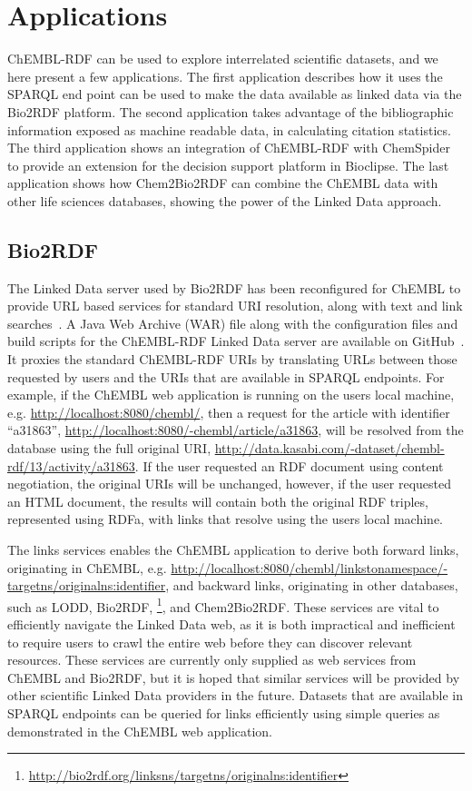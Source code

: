 \documentclass[sw]{iosart2c}
\begin{document}
\section{Applications}

ChEMBL-RDF can be used to explore interrelated scientific datasets, and we here present a few applications. 
The first application describes how it uses the SPARQL end point can be used to make the data available as linked data
via the Bio2RDF platform. The second application takes advantage of the bibliographic information
exposed as machine readable data, in calculating citation statistics. The third application shows
an integration of ChEMBL-RDF with ChemSpider to provide an extension for the decision support
platform in Bioclipse. The last application shows how Chem2Bio2RDF can combine the ChEMBL data
with other life sciences databases, showing the power of the Linked Data approach.

\subsection{Bio2RDF}

The Linked Data server used by Bio2RDF has been reconfigured for ChEMBL to provide URL
based services for standard URI resolution, along with text and link searches~\cite{Ansell2011}. 
A Java Web Archive (WAR) file along with the configuration files and build scripts for the ChEMBL-RDF Linked Data server are available on GitHub~\cite{WebAppGitHub}. 
It proxies the standard ChEMBL-RDF URIs by translating URLs between those requested by users and the URIs that are available
in SPARQL endpoints. For example, if the ChEMBL web application is running on the users
local machine, e.g. \url{http://localhost:8080/chembl/}, then a request for the
article with identifier ``a31863'', \url{http://localhost:8080/-chembl/article/a31863},
will be resolved from the database using the full original URI,
\url{http://data.kasabi.com/-dataset/chembl-rdf/13/activity/a31863}. If the
user requested an RDF document using content negotiation, the original URIs will be unchanged,
however, if the user requested an HTML document, the results will contain both the
original RDF triples, represented using RDFa, with links that resolve using the users local machine.

The links services enables the ChEMBL application to derive both forward links, originating in
ChEMBL, e.g. \url{http://localhost:8080/chembl/linkstonamespace/-targetns/originalns:identifier},
and backward links, originating in other databases, such as LODD, Bio2RDF,
\footnote{\url{http://bio2rdf.org/linksns/targetns/originalns:identifier}}, and Chem2Bio2RDF.
These services are vital to efficiently navigate the Linked Data web, as it is both
impractical and inefficient to require users to crawl the entire web before they can discover 
relevant resources. These services are currently only supplied as web services from ChEMBL and
Bio2RDF, but it is hoped that similar services will be provided by other scientific Linked Data
providers in the future. Datasets that are available in SPARQL endpoints can be queried for
links efficiently using simple queries as demonstrated in the ChEMBL web application.
\end{document}
